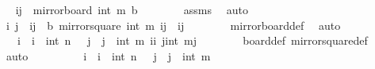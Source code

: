\begin{isabellebody}
\ \isamarkupfalse%
\ {\isachardoublequoteopen}{\isacharparenleft}{\kern0pt}i{\isacharprime}{\kern0pt}{\isacharcomma}{\kern0pt}j{\isacharprime}{\kern0pt}{\isacharparenright}{\kern0pt}\ {\isasymin}\ mirror{}{\isacharunderscore}{\kern0pt}board\ {\isacharparenleft}{\kern0pt}int\ m{\isacharplus}{\kern0pt}{}{\isacharparenright}{\kern0pt}\ {\isacharquery}{\kern0pt}b{\isachardoublequoteclose}\isanewline
\ \ \ \ \ \ \isamarkupfalse%
\ assms\ \isamarkupfalse%
\ auto\isanewline
\ \ \ \ \isamarkupfalse%
\ \isamarkupfalse%
\ i\ j\ \ {\isachardoublequoteopen}{\isacharparenleft}{\kern0pt}i{\isacharcomma}{\kern0pt}j{\isacharparenright}{\kern0pt}\ {\isasymin}\ {\isacharquery}{\kern0pt}b{\isachardoublequoteclose}\ {\isachardoublequoteopen}mirror{}{\isacharunderscore}{\kern0pt}square\ {\isacharparenleft}{\kern0pt}int\ m{\isacharplus}{\kern0pt}{}{\isacharparenright}{\kern0pt}\ {\isacharparenleft}{\kern0pt}i{\isacharcomma}{\kern0pt}j{\isacharparenright}{\kern0pt}\ {\isacharequal}{\kern0pt}\ {\isacharparenleft}{\kern0pt}i{\isacharprime}{\kern0pt}{\isacharcomma}{\kern0pt}j{\isacharprime}{\kern0pt}{\isacharparenright}{\kern0pt}{\isachardoublequoteclose}\isanewline
\ \ \ \ \ \ \isamarkupfalse%
\ mirror{}{\isacharunderscore}{\kern0pt}board{\isacharunderscore}{\kern0pt}def\ \isamarkupfalse%
\ auto\isanewline
\ \ \ \ \isamarkupfalse%
\ \isamarkupfalse%
\ {\isachardoublequoteopen}{}\ {\isasymle}\ i\ {\isasymand}\ i\ {\isasymle}\ int\ n{\isachardoublequoteclose}\ {\isachardoublequoteopen}{}\ {\isasymle}\ j\ {\isasymand}\ j\ {\isasymle}\ int\ m{\isachardoublequoteclose}\ {\isachardoublequoteopen}i{\isacharprime}{\kern0pt}{\isacharequal}{\kern0pt}i{\isachardoublequoteclose}\ {\isachardoublequoteopen}j{\isacharprime}{\kern0pt}{\isacharequal}{\kern0pt}{\isacharparenleft}{\kern0pt}int\ m{\isacharplus}{\kern0pt}{}{\isacharparenright}{\kern0pt}{\isacharminus}{\kern0pt}j{\isachardoublequoteclose}\isanewline
\ \ \ \ \ \ \isamarkupfalse%
\ board{\isacharunderscore}{\kern0pt}def\ mirror{}{\isacharunderscore}{\kern0pt}square{\isacharunderscore}{\kern0pt}def\ \isamarkupfalse%
\ auto\isanewline
\ \ \ \ \isamarkupfalse%
\ \isamarkupfalse%
\ {\isachardoublequoteopen}{}\ {\isasymle}\ i{\isacharprime}{\kern0pt}\ {\isasymand}\ i{\isacharprime}{\kern0pt}\ {\isasymle}\ int\ n{\isachardoublequoteclose}\ {\isachardoublequoteopen}{}\ {\isasymle}\ j{\isacharprime}{\kern0pt}\ {\isasymand}\ j{\isacharprime}{\kern0pt}\ {\isasymle}\ int\ m{\isachardoublequoteclose}\isanewline

\end{isabellebody}
